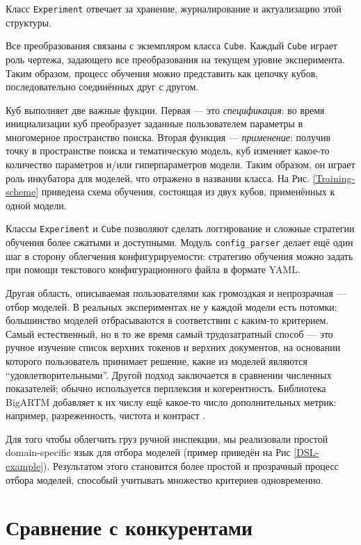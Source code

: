 Класс \texttt{Experiment} отвечает за хранение, журналирование и актуализацию этой структуры. 

Все преобразования связаны с экземпляром класса \texttt{Cube}. Каждый \texttt{Cube} играет роль чертежа, задающего все преобразования на текущем уровне эксперимента. Таким образом, процесс обучения можно представить как цепочку кубов, последовательно соединённых друг с другом.

Куб выполняет две важные фукции. Первая --- это \textit{спецификация}: во время инициализации куб преобразует заданные пользователем параметры в многомерное пространство поиска. Вторая функция --- \textit{применение}: получив точку в пространстве поиска и тематическую модель, куб изменяет какое-то количество параметров и/или гиперпараметров модели. Таким образом, он играет роль инкубатора для моделей, что отражено в названии класса. На Рис.  \ref{Training-scheme} приведена схема обучения, состоящая из двух кубов, применённых к одной модели.

Классы \texttt{Experiment} и \texttt{Cube} позволяют сделать логгирование и сложные стратегии обучения более сжатыми и доступными. Модуль \texttt{config\_parser} делает ещё один шаг в сторону облегчения конфигурируемости: стратегию обучения можно задать при помощи текстового конфигурационного файла в формате YAML.

Другая область, описываемая пользователями как громоздкая и непрозрачная --- отбор моделей. В реальных экспериментах не у каждой модели есть потомки; большинство моделей отбрасываются в соответствии с каким-то критерием. Самый естественный, но в то же время самый трудозатратный способ --- это ручное изучение список верхних токенов и верхних документов, на основании которого пользователь принимает решение, какие из моделей являются ``удовлетворительными''. Другой подход заключается в сравнении численных показателей; обычно используется перплексия и когерентность. Библиотека \mbox{BigARTM} добавляет к их числу ещё какое-то число дополнительных метрик: например, разреженность, чистота и контраст \cite{voron15mlj}.

Для того чтобы облегчить груз ручной инспекции, мы реализовали простой domain-specific язык для отбора моделей (пример приведён на Рис \ref{DSL-example}). Результатом этого становится более простой и прозрачный процесс отбора моделей, способый учитывать множество критериев одновременно.

\section{Сравнение с конкурентами}

